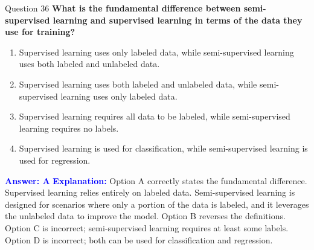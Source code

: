 \documentclass{beamer}
\begin{document}
	\begin{frame}{Question 36}
		\textbf{What is the fundamental difference between semi-supervised learning and supervised learning in terms of the data they use for training?}
		\begin{enumerate}
			\item Supervised learning uses only labeled data, while semi-supervised learning uses both labeled and unlabeled data.
			\item Supervised learning uses both labeled and unlabeled data, while semi-supervised learning uses only labeled data.
			\item Supervised learning requires all data to be labeled, while semi-supervised learning requires no labels.
			\item Supervised learning is used for classification, while semi-supervised learning is used for regression.
		\end{enumerate}
		\vspace{0.2cm}
		\textcolor{blue}{\textbf{Answer: A}}
		\vspace{0.2cm}
		\textcolor{blue}{\textbf{Explanation:}} Option A correctly states the fundamental difference. Supervised learning relies entirely on labeled data. Semi-supervised learning is designed for scenarios where only a portion of the data is labeled, and it leverages the unlabeled data to improve the model. Option B reverses the definitions. Option C is incorrect; semi-supervised learning requires at least some labels. Option D is incorrect; both can be used for classification and regression.
	\end{frame}
	
\end{document}
